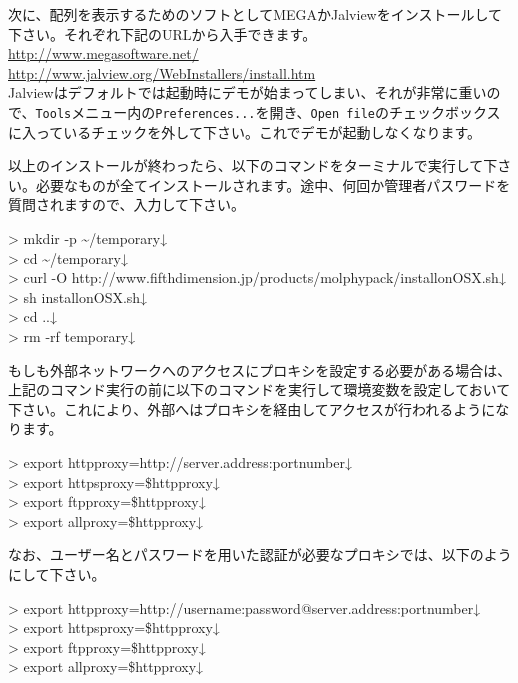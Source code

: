 \documentclass[titlepage,10pt,a4paper]{jsbook}
\newenvironment{cmd}{\begin{oframed}\raggedright\ttfamily\footnotesize\setlength{\baselineskip}{1.4em}}{\end{oframed}\vspace{-1em}}
\begin{document}
次に、配列を表示するためのソフトとしてMEGAかJalviewをインストールして下さい。それぞれ下記のURLから入手できます。\\
\href{http://www.megasoftware.net/}{http://www.megasoftware.net/}\\
\href{http://www.jalview.org/Web_Installers/install.htm}{http://www.jalview.org/Web{\textunderscore}Installers/install.htm}\\
Jalviewはデフォルトでは起動時にデモが始まってしまい、それが非常に重いので、\texttt{Tools}メニュー内の\texttt{Preferences...}を開き、\texttt{Open file}のチェックボックスに入っているチェックを外して下さい。これでデモが起動しなくなります。

以上のインストールが終わったら、以下のコマンドをターミナルで実行して下さい。必要なものが全てインストールされます。途中、何回か管理者パスワードを質問されますので、入力して下さい。
\begin{cmd}
{\textgreater} mkdir -p {\textasciitilde}/temporary↓\\
{\textgreater} cd {\textasciitilde}/temporary↓\\
{\textgreater} curl -O http://www.fifthdimension.jp/products/molphypack/install{\textunderscore}on{\textunderscore}OSX.sh↓\\
{\textgreater} sh install{\textunderscore}on{\textunderscore}OSX.sh↓\\
{\textgreater} cd ..↓\\
{\textgreater} rm -rf temporary↓
\end{cmd}
もしも外部ネットワークへのアクセスにプロキシを設定する必要がある場合は、上記のコマンド実行の前に以下のコマンドを実行して環境変数を設定しておいて下さい。これにより、外部へはプロキシを経由してアクセスが行われるようになります。
\begin{cmd}
{\textgreater} export http{\textunderscore}proxy=http://server.address:portnumber↓\\
{\textgreater} export https{\textunderscore}proxy=\$http{\textunderscore}proxy↓\\
{\textgreater} export ftp{\textunderscore}proxy=\$http{\textunderscore}proxy↓\\
{\textgreater} export all{\textunderscore}proxy=\$http{\textunderscore}proxy↓
\end{cmd}
なお、ユーザー名とパスワードを用いた認証が必要なプロキシでは、以下のようにして下さい。
\begin{cmd}
{\textgreater} export http{\textunderscore}proxy=http://username:password@server.address:portnumber↓\\
{\textgreater} export https{\textunderscore}proxy=\$http{\textunderscore}proxy↓\\
{\textgreater} export ftp{\textunderscore}proxy=\$http{\textunderscore}proxy↓\\
{\textgreater} export all{\textunderscore}proxy=\$http{\textunderscore}proxy↓
\end{cmd}
\end{document}
